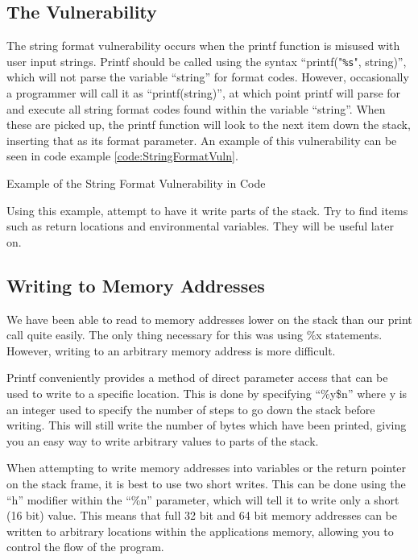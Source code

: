 		\subsection{The Vulnerability}
			The string format vulnerability occurs when the printf function is misused with user input strings.
			Printf should be called using the syntax ``printf("\verb+%s+", string)'', which will not parse the variable ``string'' for format codes.
			However, occasionally a programmer will call it as ``printf(string)'', at which point printf will parse for and execute all string format codes found within the variable ``string''.
			When these are picked up, the printf function will look to the next item down the stack, inserting that as its format parameter.
			An example of this vulnerability can be seen in code example \ref{code:StringFormatVuln}.
			\begin{code}
				\caption{Example of the String Format Vulnerability in Code}
				\label{code:StringFormatVuln}
			\end{code}
			Using this example, attempt to have it write parts of the stack.
			Try to find items such as return locations and environmental variables.
			They will be useful later on.

		\subsection{Writing to Memory Addresses}
			We have been able to read to memory addresses lower on the stack than our print call quite easily.
			The only thing necessary for this was using \%x statements.
			However, writing to an arbitrary memory address is more difficult.

			Printf conveniently provides a method of direct parameter access that can be used to write to a specific location.
			This is done by specifying ``\%y\$n'' where y is an integer used to specify the number of steps to go down the stack before writing.
			This will still write the number of bytes which have been printed, giving you an easy way to write arbitrary values to parts of the stack.

			When attempting to write memory addresses into variables or the return pointer on the stack frame, it is best to use two short writes.
			This can be done using the ``h'' modifier within the ``\%n'' parameter, which will tell it to write only a short (16 bit) value.
			This means that full 32 bit and 64 bit memory addresses can be written to arbitrary locations within the applications memory, allowing you to control the flow of the program.


